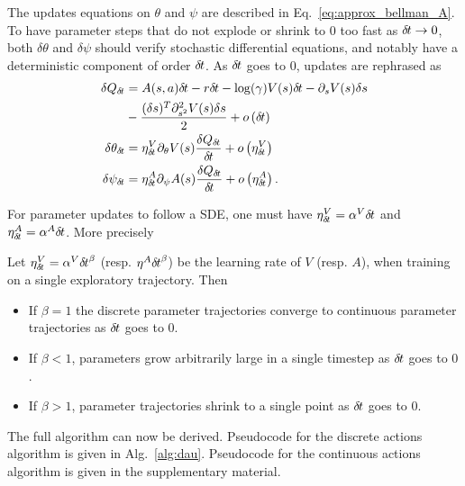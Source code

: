 The updates equations on $\theta$ and $\psi$ are described in
Eq.~\eqref{eq:approx_bellman_A}.  To have parameter steps that do not explode or shrink to $0$ too
fast as ${\delta\hspace{-.1em}t} \rightarrow 0$, both $\delta \theta$ and
$\delta \psi$ should verify stochastic differential equations, and notably
have a deterministic component of order ${\delta\hspace{-.1em}t}$. As ${\delta\hspace{-.1em}t}$ goes to $0$,
updates are rephrased as
\begin{align}
	\delta Q_{\delta\hspace{-.1em}t} &= A(s, a){\delta\hspace{-.1em}t} - r{\delta\hspace{-.1em}t} - \log(\gamma) V(s){\delta\hspace{-.1em}t} - \partial_s V(s) \delta s\nonumber \\&- \frac{(\delta s)^T \partial_{s^2}^2 V(s) \delta s}{2} + o\left({\delta\hspace{-.1em}t}\right)\\
	\delta \theta_{\delta\hspace{-.1em}t} &= \eta^V_{\delta\hspace{-.1em}t} \partial_{\theta} V(s) \frac{\delta Q_{\delta\hspace{-.1em}t}}{{\delta\hspace{-.1em}t}} + o\left(\eta^V_{\delta\hspace{-.1em}t}\right)\\
	\delta \psi_{\delta\hspace{-.1em}t} &= \eta^A_{\delta\hspace{-.1em}t} \partial_{\psi} A(s) \frac{\delta Q_{\delta\hspace{-.1em}t}}{{\delta\hspace{-.1em}t}} + o\left(\eta^A_{\delta\hspace{-.1em}t}\right).
\end{align}


For parameter updates to follow a SDE, one must
have $\eta^V_{\delta\hspace{-.1em}t} = \alpha^V {\delta\hspace{-.1em}t}$ and $\eta^A_{\delta\hspace{-.1em}t} = \alpha^A
{\delta\hspace{-.1em}t}$. More precisely
\begin{theorem}
	Let $\eta^V_{\delta\hspace{-.1em}t} = \alpha^V {\delta\hspace{-.1em}t}^\beta$ (resp. $\eta^A {\delta\hspace{-.1em}t}^\beta$) be the learning rate
	of $V$ (resp. $A$), when training on a single exploratory trajectory. Then
	\begin{itemize}
		\item If $\beta = 1$ the discrete parameter trajectories converge to continuous parameter
			trajectories as ${\delta\hspace{-.1em}t}$ goes to $0$.
		\item If $\beta < 1$, parameters grow arbitrarily large in a single timestep as ${\delta\hspace{-.1em}t}$
			goes to $0$.
		\item If $\beta > 1$, parameter trajectories shrink to a single point as 
			${\delta\hspace{-.1em}t}$ goes to $0$. 
	\end{itemize}
	\label{th:cont-params}
\end{theorem}

The full algorithm can now be derived.
Pseudocode for the discrete actions algorithm is given in Alg.~\ref{alg:dau}.
Pseudocode for the continuous actions algorithm is given in the supplementary
material.

